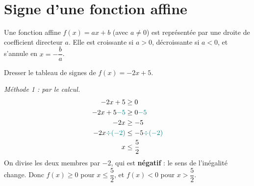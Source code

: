 \documentclass[10pt,a4paper]{article}
\begin{document}
\section{Signe d'une fonction affine} \label{annexe-signe-affine}

\begin{bloc}
\begin{prop}
Une fonction affine \(f(x)=ax+b\) (avec \(a\neq 0\)) est représentée par une droite de coefficient directeur \(a\). Elle est croissante si \(a>0\), décroissante si \(a<0\), et s'annule en \(x=-\dfrac{b}{a}\).
\end{prop}
\end{bloc}

\begin{bloc}
\begin{exple}
Dresser le tableau de signes de \(f(x)=-2x+5\).

\smallskip
\textit{Méthode 1 : par le calcul.}
\[
\begin{aligned}
-2x+5 &\geq 0\\
-2x+5\textcolor{teal}{-5} &\geq 0\textcolor{teal}{-5}\\
-2x &\geq -5\\
-2x\textcolor{teal}{\div(-2)} &\leq -5\textcolor{teal}{\div(-2)}\\
x &\leq \dfrac{5}{2}
\end{aligned}
\]
On divise les deux membres par \(-2\), qui est \textbf{négatif} : le sens de l'inégalité change. Donc \(f(x)\geq 0\) pour \(x\leq \dfrac{5}{2}\), et \(f(x)<0\) pour \(x>\dfrac{5}{2}\).

\end{exple}
\end{bloc}
\end{document}
